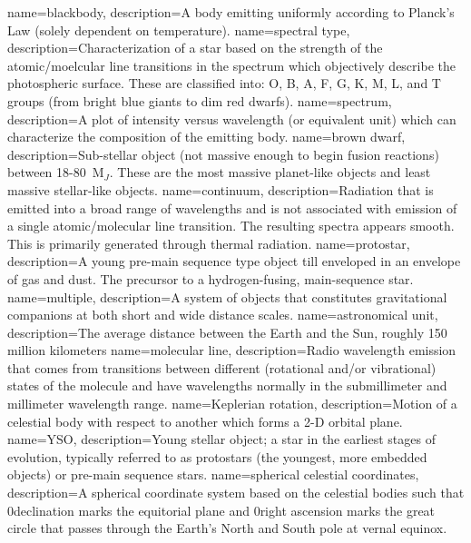 {{}
{
        name=blackbody,
        description={A body emitting uniformly according to Planck's Law (solely dependent on temperature).}
}
{
        name=spectral type,
        description={Characterization of a star based on the strength of the atomic/moelcular line transitions in the spectrum which objectively describe the photospheric surface. These are classified into: O, B, A, F, G, K, M, L, and T groups (from bright blue giants to dim red dwarfs).}
}
{
        name=spectrum,
        description={A plot of intensity versus wavelength (or equivalent unit) which can characterize the composition of the emitting body.}
}
{
        name=brown dwarf,
        description={Sub-stellar object (not massive enough to begin fusion reactions) between 18-80~M$_{J}$. These are the most massive planet-like objects and least massive stellar-like objects.}
}
{
        name=continuum,
        description={Radiation that is emitted into a broad range of wavelengths and is not associated with emission of a single atomic/molecular line transition. The resulting spectra appears smooth. This is primarily generated through thermal radiation.}
}
{
        name=protostar,
        description={A young pre-main sequence type object till enveloped in an envelope of gas and dust. The precursor to a hydrogen-fusing, main-sequence star.}
}
{
        name=multiple,
        description={A system of objects that constitutes gravitational companions at both short and wide distance scales.}
}
{
        name=astronomical unit,
        description={The average distance between the Earth and the Sun, roughly 150 million kilometers}
}
{
        name=molecular line,
        description={Radio wavelength emission that comes from transitions between different  (rotational and/or vibrational) states of the molecule and have wavelengths normally in the submillimeter and millimeter wavelength range.}
}
{
        name=Keplerian rotation,
        description={Motion of a celestial body with respect to another which forms a 2-D orbital plane.}
}
{
        name=YSO,
        description={Young stellar object; a star in the earliest stages of evolution, typically referred to as protostars (the youngest, more embedded objects) or pre-main sequence stars.}
}
{
        name=spherical celestial coordinates,
        description={A spherical coordinate system based on the celestial bodies such that 0\deg\space declination marks the equitorial plane and 0\deg\space right ascension marks the great circle that passes through the Earth's North and South pole at vernal equinox.}
}


}
